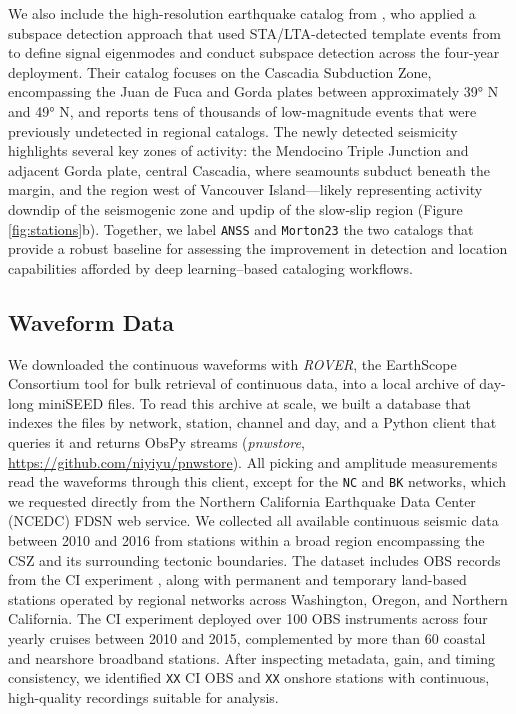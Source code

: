 \documentclass[review]{seismica}
\begin{document}
We also include the high-resolution earthquake catalog from
\citet{Morton23}, who applied a subspace detection approach that used
STA/LTA-detected template events from \citet{Stone18} to define signal
eigenmodes and conduct subspace detection across the four-year
deployment. Their catalog focuses on the Cascadia Subduction Zone,
encompassing the Juan de Fuca and Gorda plates between approximately 39°
N and 49° N, and reports tens of thousands of low-magnitude events that
were previously undetected in regional catalogs. The newly detected
seismicity highlights several key zones of activity: the Mendocino
Triple Junction and adjacent Gorda plate, central Cascadia, where
seamounts subduct beneath the margin, and the region west of Vancouver
Island---likely representing activity downdip of the seismogenic zone
and updip of the slow-slip region (Figure \ref{fig:stations}b).
Together, we label \texttt{ANSS} and \texttt{Morton23} the two catalogs
\citet{Morton23} that provide a robust baseline for assessing the
improvement in detection and location capabilities afforded by deep
learning--based cataloging workflows.

\subsection{Waveform Data}\label{waveform-data}

We downloaded the continuous waveforms with \emph{ROVER}, the EarthScope
Consortium tool for bulk retrieval of continuous data, into a local
archive of day-long miniSEED files. To read this archive at scale, we
built a database that indexes the files by network, station, channel and
day, and a Python client that queries it and returns ObsPy streams
(\emph{pnwstore}, \url{https://github.com/niyiyu/pnwstore}). All picking
and amplitude measurements read the waveforms through this client,
except for the \texttt{NC} and \texttt{BK} networks, which we requested
directly from the Northern California Earthquake Data Center (NCEDC)
FDSN web service. We collected all available continuous seismic data
between 2010 and 2016 from stations within a broad region encompassing
the CSZ and its surrounding tectonic boundaries. The dataset includes
OBS records from the CI experiment \citep{Stone2018}, along with
permanent and temporary land-based stations operated by regional
networks across Washington, Oregon, and Northern California. The CI
experiment deployed over 100 OBS instruments across four yearly cruises
between 2010 and 2015, complemented by more than 60 coastal and
nearshore broadband stations. After inspecting metadata, gain, and
timing consistency, we identified \texttt{XX} CI OBS and \texttt{XX}
onshore stations with continuous, high-quality recordings suitable for
analysis.
\end{document}
